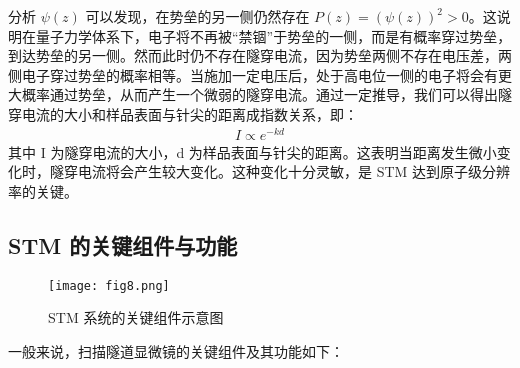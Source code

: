 \documentclass{article}
\begin{document}
分析 $\psi(z)$ 可以发现，在势垒的另一侧仍然存在 $P(z)=(\psi(z))^2 > 0$。这说明在量子力学体系下，电子将不再被“禁锢”于势垒的一侧，而是有概率穿过势垒，到达势垒的另一侧。然而此时仍不存在隧穿电流，因为势垒两侧不存在电压差，两侧电子穿过势垒的概率相等。当施加一定电压后，处于高电位一侧的电子将会有更大概率通过势垒，从而产生一个微弱的隧穿电流。通过一定推导，我们可以得出隧穿电流的大小和样品表面与针尖的距离成指数关系，即：
\begin{align*}
	I \propto e^{-kd}
\end{align*}
其中 I 为隧穿电流的大小，d 为样品表面与针尖的距离。这表明当距离发生微小变化时，隧穿电流将会产生较大变化。这种变化十分灵敏，是 STM 达到原子级分辨率的关键。

\subsection{STM 的关键组件与功能}
\begin{figure}[htbp]
	\centering
	\texttt{[image: fig8.png]}
	\caption{STM 系统的关键组件示意图}
\end{figure}
一般来说，扫描隧道显微镜的关键组件及其功能如下：
\end{document}

